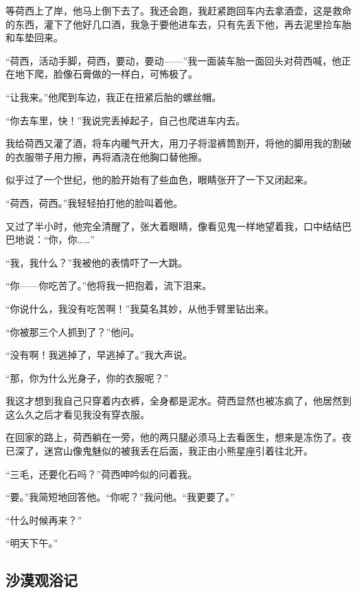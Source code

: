 \par 等荷西上了岸，他马上倒下去了。我还会跑，我赶紧跑回车内去拿酒壶，这是救命的东西，灌下了他好几口酒，我急于要他进车去，只有先丢下他，再去泥里捡车胎和车垫回来。
\par “荷西，活动手脚，荷西，要动，要动——”我一面装车胎一面回头对荷西喊，他正在地下爬，脸像石膏做的一样白，可怖极了。
\par “让我来。”他爬到车边，我正在扭紧后胎的螺丝帽。
\par “你去车里，快！”我说完丢掉起子，自己也爬进车内去。
\par 我给荷西又灌了酒，将车内暖气开大，用刀子将湿裤筒割开，将他的脚用我的割破的衣服带子用力擦，再将酒浇在他胸口替他擦。
\par 似乎过了一个世纪，他的脸开始有了些血色，眼睛张开了一下又闭起来。
\par “荷西，荷西。”我轻轻拍打他的脸叫着他。
\par 又过了半小时，他完全清醒了，张大着眼睛，像看见鬼一样地望着我，口中结结巴巴地说：“你，你……”
\par “我，我什么？”我被他的表情吓了一大跳。
\par “你——你吃苦了。”他将我一把抱着，流下泪来。
\par “你说什么，我没有吃苦啊！”我莫名其妙，从他手臂里钻出来。
\par “你被那三个人抓到了？”他问。
\par “没有啊！我逃掉了，早逃掉了。”我大声说。
\par “那，你为什么光身子，你的衣服呢？”
\par 我这才想到我自己只穿着内衣裤，全身都是泥水。荷西显然也被冻疯了，他居然到这么久之后才看见我没有穿衣服。
\par 在回家的路上，荷西躺在一旁，他的两只腿必须马上去看医生，想来是冻伤了。夜已深了，迷宫山像鬼魅似的被我丢在后面，我正由小熊星座引着往北开。
\par “三毛，还要化石吗？”荷西呻吟似的问着我。
\par “要。”我简短地回答他。“你呢？”我问他。“我更要了。”
\par “什么时候再来？”
\par “明天下午。”



\subsection{沙漠观浴记}


